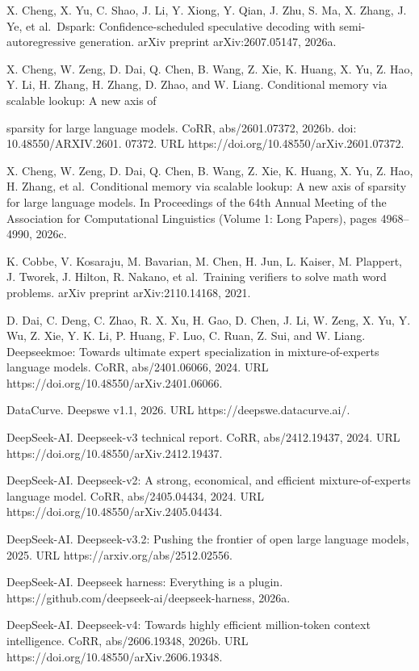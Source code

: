 \documentclass[
  10
]{article}
\begin{document}
X. Cheng, X. Yu, C. Shao, J. Li, Y. Xiong, Y. Qian, J. Zhu, S. Ma, X.
Zhang, J. Ye, et al.~Dspark: Confidence-scheduled speculative decoding
with semi-autoregressive generation. arXiv preprint arXiv:2607.05147,
2026a.

X. Cheng, W. Zeng, D. Dai, Q. Chen, B. Wang, Z. Xie, K. Huang, X. Yu, Z.
Hao, Y. Li, H. Zhang, H. Zhang, D. Zhao, and W. Liang. Conditional
memory via scalable lookup: A new axis of



sparsity for large language models. CoRR, abs/2601.07372, 2026b. doi:
10.48550/ARXIV.2601. 07372. URL
https://doi.org/10.48550/arXiv.2601.07372.

X. Cheng, W. Zeng, D. Dai, Q. Chen, B. Wang, Z. Xie, K. Huang, X. Yu, Z.
Hao, H. Zhang, et al.~Conditional memory via scalable lookup: A new axis
of sparsity for large language models. In Proceedings of the 64th Annual
Meeting of the Association for Computational Linguistics (Volume 1: Long
Papers), pages 4968--4990, 2026c.

K. Cobbe, V. Kosaraju, M. Bavarian, M. Chen, H. Jun, L. Kaiser, M.
Plappert, J. Tworek, J. Hilton, R. Nakano, et al.~Training verifiers to
solve math word problems. arXiv preprint arXiv:2110.14168, 2021.

D. Dai, C. Deng, C. Zhao, R. X. Xu, H. Gao, D. Chen, J. Li, W. Zeng, X.
Yu, Y. Wu, Z. Xie, Y. K. Li, P. Huang, F. Luo, C. Ruan, Z. Sui, and W.
Liang. Deepseekmoe: Towards ultimate expert specialization in
mixture-of-experts language models. CoRR, abs/2401.06066, 2024. URL
https://doi.org/10.48550/arXiv.2401.06066.

DataCurve. Deepswe v1.1, 2026. URL https://deepswe.datacurve.ai/.

DeepSeek-AI. Deepseek-v3 technical report. CoRR, abs/2412.19437, 2024.
URL https://doi.org/10.48550/arXiv.2412.19437.

DeepSeek-AI. Deepseek-v2: A strong, economical, and efficient
mixture-of-experts language model. CoRR, abs/2405.04434, 2024. URL
https://doi.org/10.48550/arXiv.2405.04434.

DeepSeek-AI. Deepseek-v3.2: Pushing the frontier of open large language
models, 2025. URL https://arxiv.org/abs/2512.02556.

DeepSeek-AI. Deepseek harness: Everything is a plugin.
https://github.com/deepseek-ai/deepseek-harness, 2026a.

DeepSeek-AI. Deepseek-v4: Towards highly efficient million-token context
intelligence. CoRR, abs/2606.19348, 2026b. URL
https://doi.org/10.48550/arXiv.2606.19348.
\end{document}
